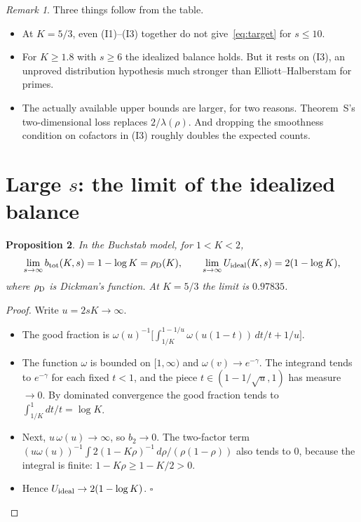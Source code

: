 \documentclass[11pt,a4paper]{article}
\newtheorem{proposition}{Proposition}
\theoremstyle{remark}
\newtheorem{remark}[proposition]{Remark}
\begin{document}
\begin{remark}
Three things follow from the table.
\begin{itemize}
\item At $K=5/3$, even (I1)--(I3) together do not give~\eqref{eq:target} for $s\le10$.
\item For $K\ge1.8$ with $s\ge6$ the idealized balance holds. But it rests on (I3), an unproved
distribution hypothesis much stronger than Elliott--Halberstam for primes.
\item The actually available upper bounds are larger, for two reasons. Theorem~S's two-dimensional
loss replaces $2/\lambda(\rho)$. And dropping the smoothness condition on cofactors in (I3) roughly
doubles the expected counts.
\end{itemize}
\end{remark}

\section{Large $s$: the limit of the idealized balance}

\begin{proposition}\label{prop:limit}
In the Buchstab model, for $1<K<2$,
\[
\lim_{s\to\infty}b_{\rm tot}(K,s)=1-\log K=\rho_{\rm D}(K),\qquad
\lim_{s\to\infty}U_{\rm ideal}(K,s)=2(1-\log K),
\]
where $\rho_{\rm D}$ is Dickman's function. At $K=5/3$ the limit is $0.97835$.
\end{proposition}
\begin{proof}
Write $u=2sK\to\infty$.
\begin{itemize}
\item The good fraction is $\omega(u)^{-1}\bigl[\int_{1/K}^{1-1/u}\omega(u(1-t))\,dt/t+1/u\bigr]$.
\item The function $\omega$ is bounded on $[1,\infty)$ and $\omega(v)\to e^{-\gamma}$. The integrand tends to $e^{-\gamma}$ for
each fixed $t<1$, and the piece $t\in(1-1/\sqrt u,1)$ has measure $\to0$. By dominated convergence the good
fraction tends to $\int_{1/K}^1dt/t=\log K$.
\item Next, $u\,\omega(u)\to\infty$, so $b_2\to0$. The two-factor term
$(u\omega(u))^{-1}\int 2(1-K\rho)^{-1}\,d\rho/(\rho(1-\rho))$ also tends to $0$, because the integral is finite: $1-K\rho\ge1-K/2>0$.
\item Hence $U_{\rm ideal}\to2(1-\log K)$. $\square$
\end{itemize}
\end{proof}
\end{document}

